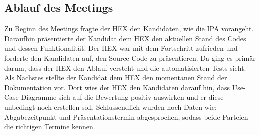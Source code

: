 \subsection{Ablauf des Meetings}
Zu Beginn des Meetings fragte der HEX den Kandidaten, wie die IPA vorangeht. Daraufhin präsentierte der Kandidat dem HEX
den aktuellen Stand des Codes und dessen Funktionalität. Der HEX war mit dem Fortschritt zufrieden und forderte den
Kandidaten auf, den Source Code zu präsentieren. Da ging es primär darum, dass der HEX den Ablauf versteht und die
automatisierten Tests sieht. \newline
Als Nächstes stellte der Kandidat dem HEX den momentanen Stand der Dokumentation vor. Dort wies der HEX den Kandidaten
darauf hin, dass Use-Case Diagramme sich auf die Bewertung positiv auswirken und er diese unbedingt noch erstellen soll.
\newline
Schlussendlich wurden noch Daten wie: Abgabezeitpunkt und Präsentationstermin abgesprochen, sodass beide Parteien
die richtigen Termine kennen.
